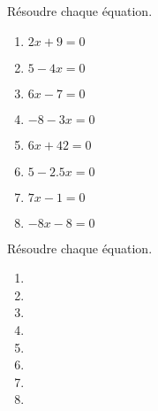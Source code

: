 \begin{exercice*}
    Résoudre chaque équation.
    \begin{multicols}{2}
        \begin{enumerate}
            \item $2x+9=0$
            \item $5-4x=0$
            \item $6x-7=0$
            \item $-8-3x=0$
            \item $6x+42=0$
            \item $5-\num{2.5}x=0$
            \item $7x-1=0$
            \item $-8x-8=0$
        \end{enumerate}
    \end{multicols}
\end{exercice*}
\begin{corrige}
    Résoudre chaque équation.
    \begin{multicols}{2}
        \begin{enumerate}
            \item {}
            \item {}
            \item {}
            \item {}
            \item {}
            \item {}
            \item {}
            \item {}
        \end{enumerate}
    \end{multicols}    
\end{corrige}

